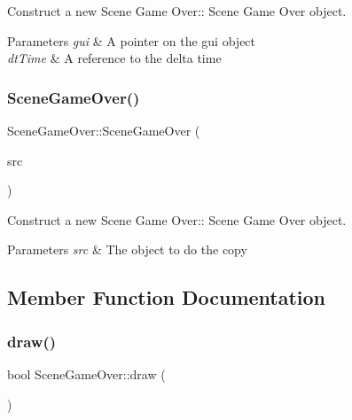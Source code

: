 Construct a new Scene Game Over\+:\+: Scene Game Over object. 


\begin{DoxyParams}{Parameters}
{\em gui} & A pointer on the gui object \\
\hline
{\em dt\+Time} & A reference to the delta time \\
\hline
\end{DoxyParams}
\mbox{\label{class_scene_game_over_a9f3f1928f1aec8b940566a51ff5e6f63}} 
\subsubsection{\texorpdfstring{Scene\+Game\+Over()}{SceneGameOver()}\hspace{0.1cm}{\footnotesize\ttfamily [2/2]}}
{\footnotesize\ttfamily Scene\+Game\+Over\+::\+Scene\+Game\+Over (\begin{DoxyParamCaption}\item[{\hyperlink{class_scene_game_over}{Scene\+Game\+Over} const \&}]{src }\end{DoxyParamCaption})}



Construct a new Scene Game Over\+:\+: Scene Game Over object. 


\begin{DoxyParams}{Parameters}
{\em src} & The object to do the copy \\
\hline
\end{DoxyParams}


\subsection{Member Function Documentation}
\mbox{\label{class_scene_game_over_aa9c4f9d3cabdc89176c0113e2864f3e8}} 
\subsubsection{\texorpdfstring{draw()}{draw()}}
{\footnotesize\ttfamily bool Scene\+Game\+Over\+::draw (\begin{DoxyParamCaption}{ }\end{DoxyParamCaption})\hspace{0.3cm}{\ttfamily [virtual]}}




